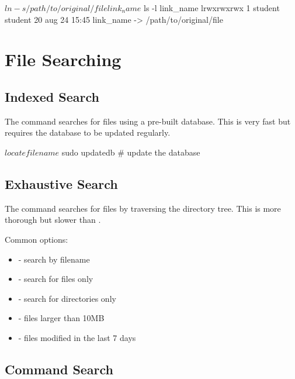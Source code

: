 \begin{screen}[style=bashstyle]
$ ln -s /path/to/original/file link_name
$ ls -l link_name
lrwxrwxrwx 1 student student 20 aug 24 15:45 link_name -> /path/to/original/file
\end{screen}

\section{File Searching}
\label{sec:file-mgmt:searching}

\subsection{Indexed Search}

The  command searches for files using a pre-built database.
This is very fast but requires the database to be updated regularly.

\begin{screen}[style=bashstyle]
$ locate filename
$ sudo updatedb  # update the database
\end{screen}

\subsection{Exhaustive Search}

The  command searches for files by traversing the directory tree.
This is more thorough but slower than .


Common  options:
\begin{itemize}
  \item {} - search by filename
  \item {} - search for files only
  \item {} - search for directories only
  \item {} - files larger than 10MB
  \item {} - files modified in the last 7 days
\end{itemize}

\subsection{Command Search}


